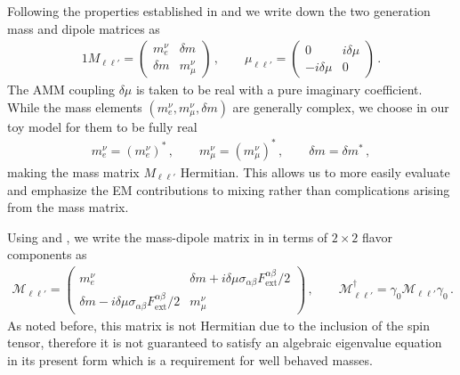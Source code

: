 Following the properties established in  and  we write down the two generation mass and dipole matrices as
\begin{alignat}{1}
\label{mix:1} M_{\ell\ell'}= 
\begin{pmatrix}
m_{e}^{\nu} & {\delta m}\\
{\delta m} & m_{\mu}^{\nu}
\end{pmatrix}\,,\qquad
\mu_{\ell\ell'} = 
\begin{pmatrix}
0 & i\delta\mu\\
-i\delta\mu & 0
\end{pmatrix}\,.
\end{alignat}
The AMM coupling $\delta\mu$ is taken to be real with a pure imaginary coefficient. While the mass elements $(m_{e}^{\nu},m_{\mu}^{\nu},{\delta m})$ are generally complex, we choose in our toy model for them to be fully real
\begin{align}
\label{choice:1}
m_{e}^{\nu}=(m_{e}^{\nu})^{*}\,,\qquad
m_{\mu}^{\nu}=(m_{\mu}^{\nu})^{*}\,,\qquad
\delta m=\delta m^{*}\,,
\end{align}
making the mass matrix $M_{\ell\ell'}$ Hermitian. This allows us to more easily evaluate and emphasize the EM contributions to mixing rather than complications arising from the mass matrix.

Using  and , we write the mass-dipole matrix in  in terms of $2\times2$ flavor components as
\begin{align}
\label{mix:2}
\mathcal{M}_{\ell\ell'} = 
\begin{pmatrix}
m_{e}^{\nu} & {\delta m}+i\delta\mu\sigma_{\alpha\beta}F^{\alpha\beta}_\mathrm{ext}/2\\
{\delta m}-i\delta\mu\sigma_{\alpha\beta}F^{\alpha\beta}_\mathrm{ext}/2 & m_{\mu}^{\nu}
\end{pmatrix}\,,\qquad
\mathcal{M}_{\ell\ell'}^{\dag}=\gamma_{0}\mathcal{M}_{\ell\ell'}\gamma_{0}\,.
\end{align}
As noted before, this matrix is not Hermitian due to the inclusion of the spin tensor, therefore it is not guaranteed to satisfy an algebraic eigenvalue equation in its present form which is a requirement for well behaved masses.

